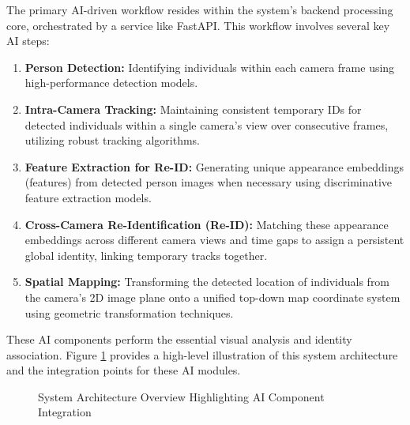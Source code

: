 The primary AI-driven workflow resides within the system's backend processing core, orchestrated by a service like FastAPI. This workflow involves several key AI steps:
\begin{enumerate}
    \item \textbf{Person Detection:} Identifying individuals within each camera frame using high-performance detection models.
    \item \textbf{Intra-Camera Tracking:} Maintaining consistent temporary IDs for detected individuals within a single camera's view over consecutive frames, utilizing robust tracking algorithms.
    \item \textbf{Feature Extraction for Re-ID:} Generating unique appearance embeddings (features) from detected person images when necessary using discriminative feature extraction models.
    \item \textbf{Cross-Camera Re-Identification (Re-ID):} Matching these appearance embeddings across different camera views and time gaps to assign a persistent global identity, linking temporary tracks together.
    \item \textbf{Spatial Mapping:} Transforming the detected location of individuals from the camera's 2D image plane onto a unified top-down map coordinate system using geometric transformation techniques.
\end{enumerate}
These AI components perform the essential visual analysis and identity association. Figure \ref{fig:ai-architecture-overview} provides a high-level illustration of this system architecture and the integration points for these AI modules.

\begin{figure}[!htb] %
    \centering
    \caption{System Architecture Overview Highlighting AI Component Integration}
    \label{fig:ai-architecture-overview}
\end{figure}
\clearpage %

